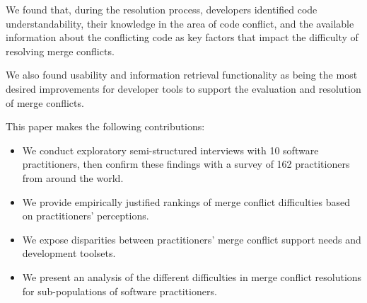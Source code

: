 We found that, during the resolution process, developers identified code understandability, their knowledge in the area of code conflict, and the available information about the conflicting code as key factors that impact the difficulty of resolving merge conflicts.

We also found usability and information retrieval functionality as being the most desired improvements for developer tools to support the evaluation and resolution of merge conflicts.

This paper makes the following contributions:
\begin{itemize}
\item We conduct exploratory semi-structured interviews with 10 software practitioners, then confirm these findings with a survey of 162 practitioners from around the world.
\item We provide empirically justified rankings of merge conflict difficulties based on practitioners' perceptions.
\item We expose disparities between practitioners' merge conflict support needs and development toolsets.
\item We present an analysis of the different difficulties in merge conflict resolutions for sub-populations of software practitioners.
\end{itemize}